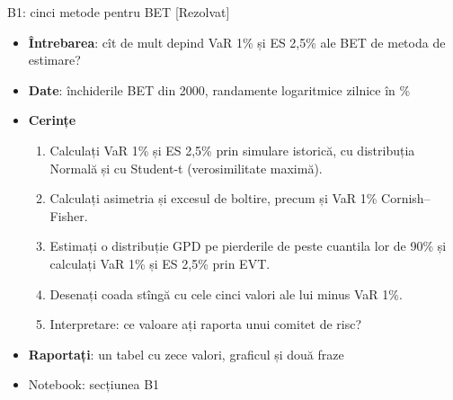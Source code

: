 \begin{frame}{B1: cinci metode pentru BET [Rezolvat]}
\itemsize{\footnotesize}
\begin{itemize}
\item \textbf{Întrebarea}: cît de mult depind VaR 1\% și ES 2,5\% ale BET de metoda de estimare?
\item \textbf{Date}: închiderile BET din 2000, randamente logaritmice zilnice în \%
\item \textbf{Cerințe}
\begin{enumerate}
    \item Calculați VaR 1\% și ES 2,5\% prin simulare istorică, cu distribuția Normală și cu Student-t (verosimilitate maximă).
    \item Calculați asimetria și excesul de boltire, precum și VaR 1\% Cornish--Fisher.
    \item Estimați o distribuție GPD pe pierderile de peste cuantila lor de 90\% și calculați VaR 1\% și ES 2,5\% prin EVT.
    \item Desenați coada stîngă cu cele cinci valori ale lui minus VaR 1\%.
    \item Interpretare: ce valoare ați raporta unui comitet de risc?
\end{enumerate}
\item \textbf{Raportați}: un tabel cu zece valori, graficul și două fraze
\item Notebook: secțiunea B1
\end{itemize}
\end{frame}

